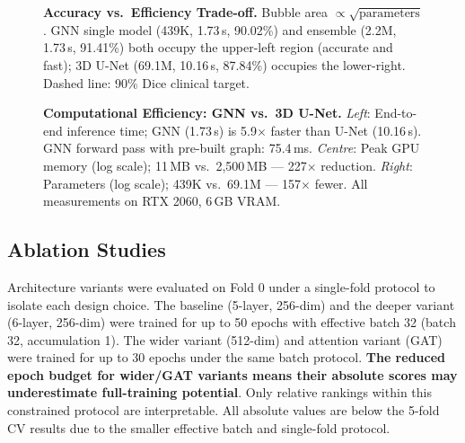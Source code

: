 \documentclass{article}
\begin{document}
\begin{figure}[htbp]
\caption{\textbf{Accuracy vs.\ Efficiency Trade-off.}
Bubble area $\propto\sqrt{\text{parameters}}$. GNN single model (439K, 1.73\,s,
90.02\%) and ensemble (2.2M, 1.73\,s, 91.41\%) both occupy the upper-left region
(accurate and fast); 3D U-Net (69.1M, 10.16\,s, 87.84\%) occupies the lower-right.
Dashed line: 90\% Dice clinical target.}
\label{fig:bubble}
\end{figure}

\begin{figure}[htbp]
\caption{\textbf{Computational Efficiency: GNN vs.\ 3D U-Net.}
\textit{Left}: End-to-end inference time; GNN (1.73\,s) is 5.9$\times$ faster
than U-Net (10.16\,s). GNN forward pass with pre-built graph: 75.4\,ms.
\textit{Centre}: Peak GPU memory (log scale); 11\,MB vs.\ 2,500\,MB ---
227$\times$ reduction. \textit{Right}: Parameters (log scale); 439K vs.\ 69.1M ---
157$\times$ fewer. All measurements on RTX 2060, 6\,GB VRAM.}
\label{fig:efficiency}
\end{figure}

\subsection{Ablation Studies}

Architecture variants were evaluated on Fold 0 under a single-fold protocol to
isolate each design choice. The baseline (5-layer, 256-dim) and the deeper variant
(6-layer, 256-dim) were trained for up to 50 epochs with effective batch 32 (batch
32, accumulation 1). The wider variant (512-dim) and attention variant (GAT) were
trained for up to 30 epochs under the same batch protocol. \textbf{The reduced epoch
budget for wider/GAT variants means their absolute scores may underestimate
full-training potential}. Only relative rankings within this constrained protocol
are interpretable. All absolute values are below the 5-fold CV results due to
the smaller effective batch and single-fold protocol.
\end{document}
